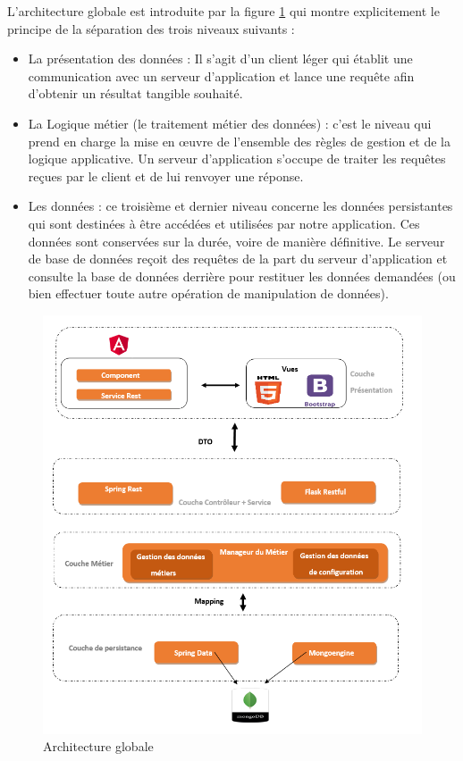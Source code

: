 L'architecture globale est introduite par la figure \ref{fig:architecture} qui montre explicitement le principe de la s\'eparation des trois niveaux suivants :
\begin{itemize}
\item La pr\'esentation des donn\'ees : Il s'agit d'un client l\'eger qui \'etablit une communication avec un serveur d'application et lance une requ\^ete afin d'obtenir un r\'esultat tangible souhait\'e.
\item La Logique m\'etier (le traitement m\'etier des donn\'ees) : c'est le niveau qui prend en charge la mise en \oe uvre de l'ensemble des r\`egles de gestion et de la logique applicative. Un serveur d'application s'occupe de traiter les requ\^etes reçues par le client et de lui renvoyer une r\'eponse.
\item Les donn\'ees : ce troisi\`eme et dernier niveau concerne les donn\'ees persistantes qui sont destin\'ees \`a \^etre acc\'ed\'ees et utilis\'ees par notre application. Ces donn\'ees sont conserv\'ees sur la dur\'ee, voire de mani\`ere d\'efinitive. Le serveur de base de donn\'ees reçoit des requ\^etes de la part du serveur d'application et consulte la base de donn\'ees derri\`ere pour restituer les donn\'ees demand\'ees (ou bien effectuer toute autre op\'eration de manipulation de donn\'ees).
\end{itemize}
\begin{figure}[!ht]\centering
\includegraphics[scale=0.8]{architecture}
\caption{Architecture globale}
\label{fig:architecture}
\end{figure}


